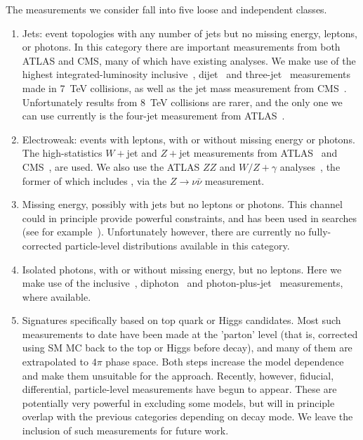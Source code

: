 \documentclass[floatfix]{article}
\begin{document}
The measurements we consider fall into five loose and independent classes.
\begin{enumerate}
\item
Jets: event topologies with any number of jets but no missing energy, leptons, or photons. In this category there
are important measurements from both ATLAS and CMS, many of which have existing \rivet analyses. We make use of 
the highest integrated-luminosity inclusive~\cite{Aad:2014vwa,Chatrchyan:2014gia}, dijet~\cite{Aad:2013tea,Aad:2014pua} 
and three-jet~\cite{Aad:2014rma} %
measurements made in 7~TeV collisions, as well as the jet mass 
measurement from CMS~\cite{Chatrchyan:2013vbb}.
Unfortunately results from 8~TeV collisions are rarer, and the only one we can use currently is the four-jet 
measurement from ATLAS~\cite{Aad:2015nda}.
\item
Electroweak: events with leptons, with or without missing energy or photons. The high-statistics $W+$jet and $Z+$jet measurements 
from ATLAS~\cite{Aad:2014qxa,Aad:2013ysa} 
and CMS~\cite{Khachatryan:2014uva}, are used.
We also use the ATLAS $ZZ$ and $W/Z+\gamma$ analyses~\cite{Aad:2012awa,Aad:2013izg}, the former of which includes \MET, 
via the $Z \rightarrow \nu\bar{\nu}$ measurement.
\item
Missing energy, possibly with jets but no leptons or photons. This channel could in principle provide powerful constraints, and has been 
used in searches (see for example~\cite{Aad:2012fqa}). Unfortunately however, there are currently no fully-corrected particle-level 
distributions available in this category. 
\item
Isolated photons, with or without missing energy, but no leptons. Here we make use of the inclusive~\cite{Aad:2013zba}, diphoton~\cite{Aad:2012tba} and 
photon-plus-jet~\cite{ATLAS:2012ar} measurements, where available.
\item
Signatures specifically based on top quark or Higgs candidates. Most such measurements to date have been made at the 'parton' level (that is,
corrected using SM MC back to the top or Higgs before decay), and many of them are extrapolated to $4\pi$ phase space. Both steps increase
the model dependence and make them unsuitable for the \Contur approach. Recently, however, fiducial, differential, particle-level measurements
have begun to appear\cite{Aad:2015hna,Khachatryan:2016gxp}. These are potentially very powerful in excluding some models, but will in principle 
overlap with the previous 
categories depending on decay mode. We leave the inclusion of such measurements for future work.
\end{enumerate}
\end{document}
